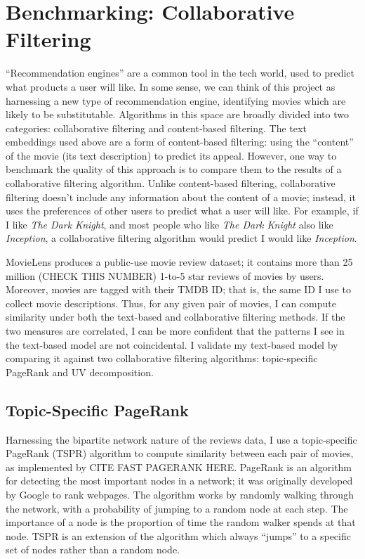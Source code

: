 \documentclass{article}
\begin{document}
\section{Benchmarking: Collaborative Filtering}

``Recommendation engines'' are a common tool in the tech world, used to predict what products a user will like. In some sense, we can think of this project as harnessing a new type of recommendation engine, identifying movies which are likely to be substitutable. Algorithms in this space are broadly divided into two categories: collaborative filtering and content-based filtering. The text embeddings used above are a form of content-based filtering: using the ``content'' of the movie (its text description) to predict its appeal. However, one way to benchmark the quality of this approach is to compare them to the results of a collaborative filtering algorithm. Unlike content-based filtering, collaborative filtering doesn't include any information about the content of a movie; instead, it uses the preferences of other users to predict what a user will like. For example, if I like \emph{The Dark Knight}, and most people who like \emph{The Dark Knight} also like \emph{Inception}, a collaborative filtering algorithm would predict I would like \emph{Inception}. 

MovieLens produces a public-use movie review dataset; it contains more than 25 million (CHECK THIS NUMBER) 1-to-5 star reviews of movies by users. Moreover, movies are tagged with their TMDB ID; that is, the same ID I use to collect movie descriptions. Thus, for any given pair of movies, I can compute similarity under both the text-based and collaborative filtering methods. If the two measures are correlated, I can be more confident that the patterns I see in the text-based model are not coincidental. I validate my text-based model by comparing it against two collaborative filtering algorithms: topic-specific PageRank and UV decomposition.

\subsection{Topic-Specific PageRank}

Harnessing the bipartite network nature of the reviews data, I use a topic-specific PageRank (TSPR) algorithm to compute similarity between each pair of movies, as implemented by CITE FAST PAGERANK HERE. PageRank is an algorithm for detecting the most important nodes in a network; it was originally developed by Google to rank webpages. The algorithm works by randomly walking through the network, with a probability of jumping to a random node at each step. The importance of a node is the proportion of time the random walker spends at that node. TSPR is an extension of the algorithm which always ``jumps'' to a specific set of nodes rather than a random node.
\end{document}
